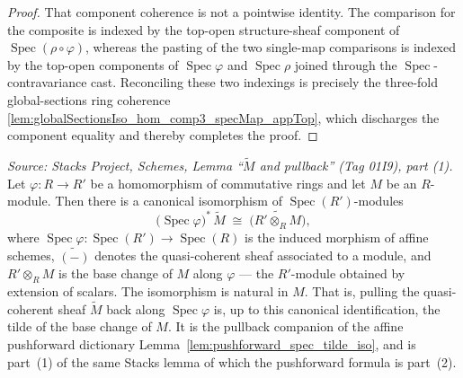 \begin{lemma}
\begin{proof}
    That component coherence is not a pointwise identity. The comparison for the composite
    is indexed by the top-open structure-sheaf component of
    \(\operatorname{Spec}(\rho\circ\varphi)\), whereas the pasting of the two single-map
    comparisons is indexed by the top-open components of \(\operatorname{Spec}\varphi\) and
    \(\operatorname{Spec}\rho\) joined through the \(\operatorname{Spec}\)-contravariance
    cast. Reconciling these two indexings is precisely the three-fold global-sections ring
    coherence \cref{lem:globalSectionsIso_hom_comp3_specMap_appTop}, which discharges the
    component equality and thereby completes the proof.
  \end{proof}
\end{lemma}

\begin{lemma}


  \label{lem:pullback_spec_tilde_iso}
  \textit{Source: Stacks Project, Schemes, Lemma ``\(\widetilde M\) and pullback''
  (Tag 01I9), part (1).}
  Let \(\varphi : R \to R'\) be a homomorphism of commutative rings and let \(M\)
  be an \(R\)-module. Then there is a canonical isomorphism of
  \(\operatorname{Spec}(R')\)-modules
  \[
    \bigl(\operatorname{Spec}\varphi\bigr)^{*}\,\widetilde{M}
    \;\cong\;
    \widetilde{\bigl(R' \otimes_R M\bigr)},
  \]
  where \(\operatorname{Spec}\varphi : \operatorname{Spec}(R') \to
  \operatorname{Spec}(R)\) is the induced morphism of affine schemes,
  \(\widetilde{(-)}\) denotes the quasi-coherent sheaf associated to a module, and
  \(R' \otimes_R M\) is the base change of \(M\) along \(\varphi\) — the
  \(R'\)-module obtained by extension of scalars. The isomorphism is natural in
  \(M\). That is, pulling the quasi-coherent sheaf \(\widetilde{M}\) back along
  \(\operatorname{Spec}\varphi\) is, up to this canonical identification, the tilde
  of the base change of \(M\). It is the pullback companion of the affine
  pushforward dictionary Lemma~\ref{lem:pushforward_spec_tilde_iso}, and is part~(1)
  of the same Stacks lemma of which the pushforward formula is part~(2).
\end{lemma}

